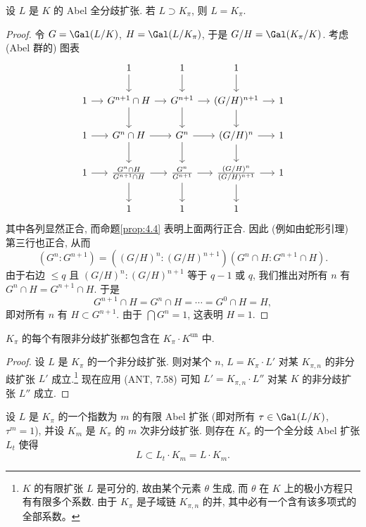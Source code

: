 \begin{lemma}\label{lem:4.9}
设 $L$ 是 $K$ 的 Abel 全分歧扩张. 若 $L\supset K_{\pi}$, 则 $L=K_{\pi}$.
\end{lemma}

\begin{proof}
令 $G=\Gal(L/K)$, $H=\Gal(L/K_{\pi})$, 于是 $G/H=\Gal(K_{\pi}/K)$. 考虑 (Abel 群的) 图表
\[
\begin{tikzcd}[column sep=small]
 & 1\ar[d] & 1\ar[d] & 1\ar[d] & \\
1\ar[r] & G^{n+1}\cap H\ar[r]\ar[d] & G^{n+1}\ar[r]\ar[d] & (G/H)^{n+1}\ar[r]\ar[d] & 1\\
1\ar[r] & G^n\cap H\ar[r]\ar[d] & G^n\ar[r]\ar[d] & (G/H)^n\ar[r]\ar[d] & 1\\
1\ar[r] & \frac{G^n\cap H}{G^{n+1}\cap H}\ar[r]\ar[d] & \frac{G^n}{G^{n+1}}\ar[r]\ar[d] & \frac{(G/H)^n}{(G/H)^{n+1}}\ar[r]\ar[d] & 1\\
 & 1 & 1 & 1 &
\end{tikzcd}
\]
其中各列显然正合, 而命题\ref{prop:4.4} 表明上面两行正合. 因此 (例如由蛇形引理) 第三行也正合, 从而
\[
(G^n:G^{n+1})=((G/H)^n:(G/H)^{n+1})(G^n\cap H:G^{n+1}\cap H).
\]
由于右边 $\le q$ 且 $(G/H)^n:(G/H)^{n+1}$ 等于 $q-1$ 或 $q$, 我们推出对所有 $n$ 有 $G^n\cap H=G^{n+1}\cap H$. 于是
\[
G^{n+1}\cap H=G^n\cap H=\cdots=G^0\cap H=H,
\]
即对所有 $n$ 有 $H\subset G^{n+1}$. 由于 $\bigcap G^n=1$, 这表明 $H=1$.
\end{proof}

\begin{lemma}\label{lem:4.10}
$K_{\pi}$ 的每个有限非分歧扩张都包含在 $K_{\pi}\cdot K^{\mathrm{un}}$ 中.
\end{lemma}

\begin{proof}
设 $L$ 是 $K_{\pi}$ 的一个非分歧扩张. 则对某个 $n$, $L=K_{\pi}\cdot L'$ 对某 $K_{\pi,n}$ 的非分歧扩张 $L'$ 成立.\footnote{$K$ 的有限扩张 $L$ 是可分的, 故由某个元素 $\theta$ 生成, 而 $\theta$ 在 $K$ 上的极小方程只有有限多个系数. 由于 $K_{\pi}$ 是子域链 $K_{\pi,n}$ 的并, 其中必有一个含有该多项式的全部系数。} 现在应用 (ANT, 7.58) 可知 $L'=K_{\pi,n}\cdot L''$ 对某 $K$ 的非分歧扩张 $L''$ 成立.
\end{proof}

\begin{lemma}\label{lem:4.11}
设 $L$ 是 $K_{\pi}$ 的一个指数为 $m$ 的有限 Abel 扩张 (即对所有 $\tau\in\Gal(L/K)$, $\tau^m=1$), 并设 $K_m$ 是 $K_{\pi}$ 的 $m$ 次非分歧扩张. 则存在 $K_{\pi}$ 的一个全分歧 Abel 扩张 $L_t$ 使得
\[
L\subset L_t\cdot K_m=L\cdot K_m.
\]
\end{lemma}

